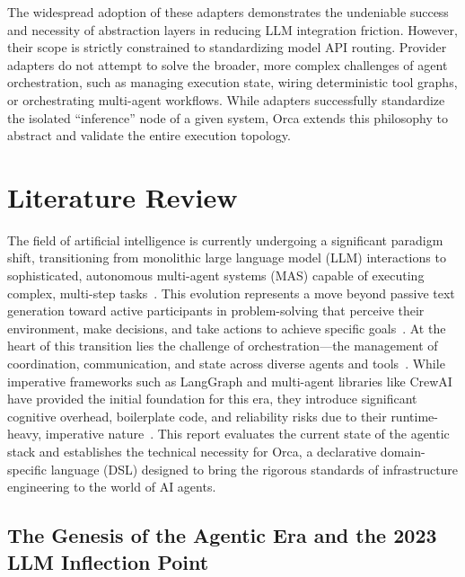 \documentclass[sigconf,nonacm]{acmart}
\begin{document}
The widespread adoption of these adapters demonstrates the undeniable
success and necessity of abstraction layers in reducing LLM integration
friction. However, their scope is strictly constrained to standardizing model
API routing. Provider adapters do not attempt to solve the broader, more
complex challenges of agent orchestration, such as managing execution state,
wiring deterministic tool graphs, or orchestrating multi-agent workflows.
While adapters successfully standardize the isolated ``inference'' node of
a given system, Orca extends this philosophy to abstract and validate the
entire execution topology.

\section{Literature Review}
\label{sec:litreview}

The field of artificial intelligence is currently undergoing a significant
paradigm shift, transitioning from monolithic large language model (LLM)
interactions to sophisticated, autonomous multi-agent systems (MAS) capable
of executing complex, multi-step tasks~\cite{crewai2024,autogen2024}. This
evolution represents a move beyond passive text generation toward active
participants in problem-solving that perceive their environment, make
decisions, and take actions to achieve specific goals~\cite{crewai2024,autogen2024}.
At the heart of this transition lies the challenge of orchestration---the
management of coordination, communication, and state across diverse agents
and tools~\cite{autogen2024,anthropic2024mcp}. While imperative frameworks
such as LangGraph and multi-agent libraries like CrewAI have provided the
initial foundation for this era, they introduce significant cognitive
overhead, boilerplate code, and reliability risks due to their
runtime-heavy, imperative nature~\cite{docker2025cagent,crewai2024}. This
report evaluates the current state of the agentic stack and establishes the
technical necessity for Orca, a declarative domain-specific language (DSL)
designed to bring the rigorous standards of infrastructure engineering to
the world of AI agents.

\subsection{The Genesis of the Agentic Era and the 2023 LLM Inflection Point}
\label{sec:litreview:genesis}
\end{document}
